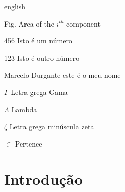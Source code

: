 \documentclass[12pt,openright,twoside,a4paper,english,french,spanish,brazil]{abntex2}
\begin{document}

\begin{resumo} 
 
\end{resumo}

\begin{resumo}[Abstract]
 \begin{otherlanguage*}{english}
  
 \end{otherlanguage*}
\end{resumo}

\listoffigures*
\cleardoublepage

\listoftables*
\cleardoublepage

\begin{siglas}
 \item[Fig.] Area of the $i^{th}$ component
 \item[456] Isto é um número
 \item[123] Isto é outro número
 \item[Marcelo Durgante] este é o meu nome
\end{siglas}

\begin{simbolos}
 \item[$ \Gamma $] Letra grega Gama
 \item[$ \Lambda $] Lambda
 \item[$ \zeta $] Letra grega minúscula zeta
 \item[$ \in $] Pertence
\end{simbolos}

\tableofcontents*
\cleardoublepage



\textual

\chapter*[Introdução]{Introdução}
\end{document}
